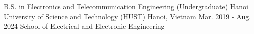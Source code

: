 
\begin{cventries}

  \cventry
  {B.S. in Electronics and Telecommunication Engineering (Undergraduate)} %
  {Hanoi University of Science and Technology (HUST)} %
  {Hanoi, Vietnam} %
  {Mar. 2019 - Aug. 2024} %
  {School of Electrical and Electronic Engineering}

\end{cventries}
